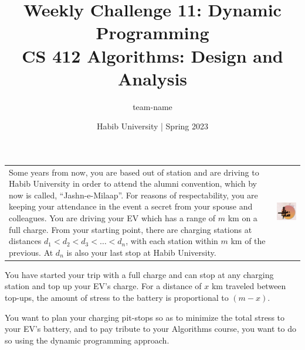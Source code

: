 \documentclass[a4paper]{exam}
\title{Weekly Challenge 11: Dynamic Programming\\CS 412 Algorithms: Design and Analysis}
\author{team-name}  %
\date{Habib University | Spring 2023}
\begin{document}
\maketitle

\begin{questions}

  

  \begin{tabularx}{\linewidth}{Xr}
    Some years from now, you are based out of station and are driving to Habib University in order to attend the alumni convention, which by now is called, ``Jashn-e-Milaap''. For reasons of respectability, you are keeping your attendance in the event a secret from your spouse and colleagues. You are driving your EV which has a range of $m$ km on a full charge. From your starting point, there are charging stations at distances $d_1 < d_2 < d_3 <\ldots<d_n$, with each station within $m$ km of the previous. At $d_n$ is also your last stop at Habib University.
    &
    \includegraphics[valign=t,scale=.7]{milaap}\\
  \end{tabularx}

  You have started your trip with a full charge and can stop at any charging station and top up your EV's charge. For a distance of $x$ km traveled between top-ups, the amount of stress to the battery is proportional to $(m-x)$.

  You want to plan your charging pit-stops so as to minimize the total stress to your EV's battery, and to pay tribute to your Algorithms course, you want to do so using the dynamic programming approach.

\end{questions}
\end{document}
